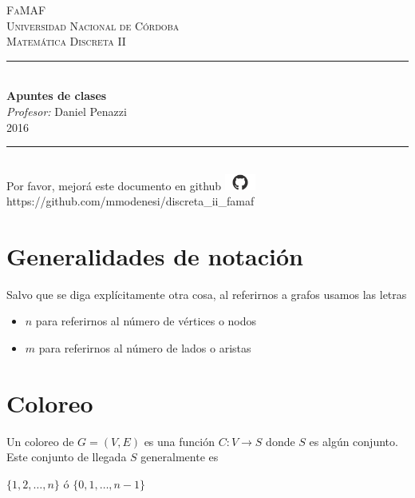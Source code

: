 \documentclass[10pt,a4paper]{article}
\begin{document}
\begin{titlepage}
\newcommand{\HRule}{\rule{\linewidth}{0.5mm}}
\center
\textsc{\Large{FaMAF}}\\[0.5cm]
\textsc{\large{Universidad Nacional de Córdoba}}\\[0.5cm]
\textsc{\LARGE{Matemática Discreta II}}\\[1.5cm]

\HRule\\[0.4cm]
{\huge \bfseries Apuntes de clases}\\
\vspace{1cm}
\Large \emph{Profesor:} Daniel Penazzi\\
2016
\HRule\\[4.5cm]

\vspace*{\fill}
Por favor, mejorá este documento en github
\includegraphics[width=1cm]{definitions/github-mark.png}
https://github.com/mmodenesi/discreta\_ii\_famaf
\end{titlepage}


\section*{Generalidades de notación}

Salvo que se diga explícitamente otra cosa, al referirnos a grafos usamos las letras

\begin{itemize}

	\item $n$ para referirnos al número de vértices o nodos
	\item $m$ para referirnos al número de lados o aristas
\end{itemize}

\section*{Coloreo}

Un coloreo de $G = (V, E)$ es una función $C: V \rightarrow S$ donde $S$ es algún conjunto. Este conjunto de llegada $S$ generalmente es

\begin{center}
$\{1, 2,\dots, n\}$ ó $\{0, 1, \dots, n-1\}$
\end{center}
\end{document}
